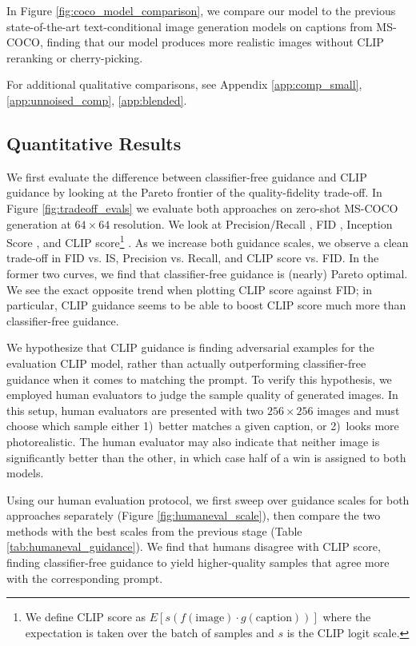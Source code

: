 In Figure \ref{fig:coco_model_comparison}, we compare our model to the previous state-of-the-art text-conditional image generation models on captions from MS-COCO, finding that our model produces more realistic images without CLIP reranking or cherry-picking.

For additional qualitative comparisons, see Appendix \ref{app:comp_small}, \ref{app:unnoised_comp}, \ref{app:blended}. 

\subsection{Quantitative Results}
\label{sec:quantitative_results}

We first evaluate the difference between classifier-free guidance and CLIP guidance by looking at the Pareto frontier of the quality-fidelity trade-off. In Figure \ref{fig:tradeoff_evals} we evaluate both approaches on zero-shot MS-COCO generation at $64 \times 64$ resolution. We look at Precision/Recall \mbox{\citep{precrecall}}, FID \mbox{\citep{fid}}, Inception Score \mbox{\citep{inceptionscore}}, and CLIP score\footnote{We define CLIP score as $E[s (f(\textrm{image})\cdot g(\textrm{caption}))]$ where the expectation is taken over the batch of samples and $s$ is the CLIP logit scale.} \citep{clip}. As we increase both guidance scales, we observe a clean trade-off in FID vs. IS, Precision vs. Recall, and CLIP score vs. FID. In the former two curves, we find that classifier-free guidance is (nearly) Pareto optimal. We see the exact opposite trend when plotting CLIP score against FID; in particular, CLIP guidance seems to be able to boost CLIP score much more than classifier-free guidance.

We hypothesize that CLIP guidance is finding adversarial examples for the evaluation CLIP model, rather than actually outperforming classifier-free guidance when it comes to matching the prompt. To verify this hypothesis, we employed human evaluators to judge the sample quality of generated images. In this setup, human evaluators are presented with two $256 \times 256$ images and must choose which sample either 1)~better matches a given caption, or 2)~looks more photorealistic. The human evaluator may also indicate that neither image is significantly better than the other, in which case half of a win is assigned to both models.

Using our human evaluation protocol, we first sweep over guidance scales for both approaches separately (Figure \ref{fig:humaneval_scale}), then compare the two methods with the best scales from the previous stage (Table \ref{tab:humaneval_guidance}). We find that humans disagree with CLIP score, finding classifier-free guidance to yield higher-quality samples that agree more with the corresponding prompt.

